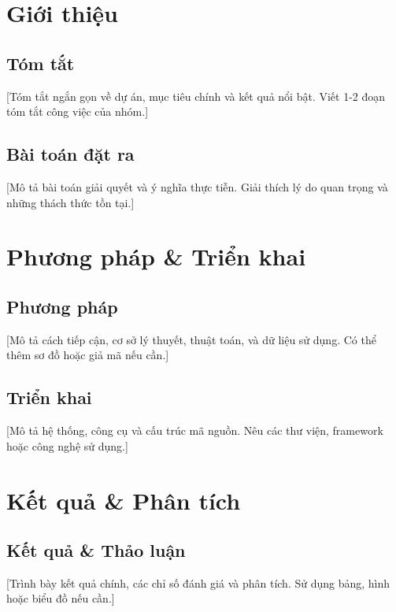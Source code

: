 \documentclass[a4paper]{book}
\begin{document}
\listoffigures %

\listoftables %

\tableofcontents
\clearpage

\chapter{Giới thiệu}

\section{Tóm tắt}
[Tóm tắt ngắn gọn về dự án, mục tiêu chính và kết quả nổi bật. Viết 1-2 đoạn tóm tắt công việc của nhóm.]

\section{Bài toán đặt ra}
[Mô tả bài toán giải quyết và ý nghĩa thực tiễn. Giải thích lý do quan trọng và những thách thức tồn tại.]

\chapter{Phương pháp \& Triển khai}

\section{Phương pháp}
[Mô tả cách tiếp cận, cơ sở lý thuyết, thuật toán, và dữ liệu sử dụng. Có thể thêm sơ đồ hoặc giả mã nếu cần.]

\section{Triển khai}
[Mô tả hệ thống, công cụ và cấu trúc mã nguồn. Nêu các thư viện, framework hoặc công nghệ sử dụng.]

\chapter{Kết quả \& Phân tích}

\section{Kết quả \& Thảo luận}
[Trình bày kết quả chính, các chỉ số đánh giá và phân tích. Sử dụng bảng, hình hoặc biểu đồ nếu cần.]
\end{document}
